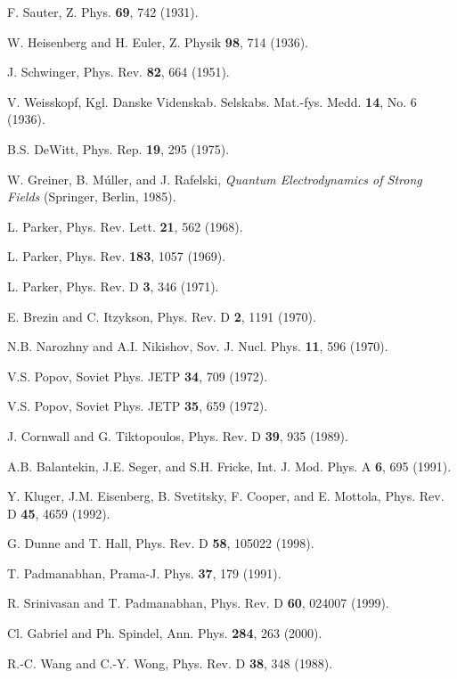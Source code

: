 \documentclass[a4paper,prd,showpacs,preprintnumbers,amsmath,amssymb]{revtex4}
\begin{document}
\begin{references}

 F. Sauter, Z. Phys. {\bf 69}, 742 (1931).

 W. Heisenberg and H. Euler, Z. Physik {\bf
98}, 714 (1936).

 J. Schwinger, Phys. Rev. {\bf 82}, 664 (1951).

 V. Weisskopf, Kgl. Danske Videnskab. Selskabs. Mat.-fys. Medd.
{\bf 14}, No. 6 (1936).

 B.S. DeWitt, Phys. Rep. {\bf 19}, 295 (1975).

 W. Greiner, B. M\'{u}ller, and J. Rafelski,
{\it Quantum Electrodynamics of Strong Fields} (Springer, Berlin,
1985).

 L. Parker, Phys. Rev. Lett. {\bf 21}, 562 (1968).

 L. Parker, Phys. Rev. {\bf 183}, 1057 (1969).

 L. Parker, Phys. Rev. D {\bf 3}, 346 (1971).

 E. Brezin and C. Itzykson, Phys. Rev. D {\bf 2},
1191 (1970).

 N.B. Narozhny and A.I. Nikishov, Sov. J. Nucl. Phys.
{\bf 11}, 596 (1970).

 V.S. Popov, Soviet Phys. JETP {\bf 34}, 709
(1972).

 V.S. Popov, Soviet Phys. JETP {\bf 35}, 659 (1972).

 J. Cornwall and G. Tiktopoulos, Phys. Rev. D {\bf
39}, 935 (1989).

 A.B. Balantekin, J.E. Seger, and S.H. Fricke, Int.
J. Mod. Phys. A {\bf 6}, 695 (1991).

  Y. Kluger, J.M. Eisenberg, B. Svetitsky, F. Cooper, and E.
Mottola, Phys. Rev. D {\bf 45}, 4659 (1992).

 G. Dunne and T. Hall, Phys. Rev. D {\bf 58}, 105022
(1998).

 T. Padmanabhan, Prama-J. Phys. {\bf 37}, 179
(1991).

 R. Srinivasan and T. Padmanabhan, Phys. Rev.
D {\bf 60}, 024007 (1999).

 Cl. Gabriel and Ph. Spindel, Ann. Phys. {\bf 284}, 263 (2000).

 R.-C. Wang and C.-Y. Wong, Phys. Rev. D {\bf 38},
348 (1988).


\end{references}
\end{document}
